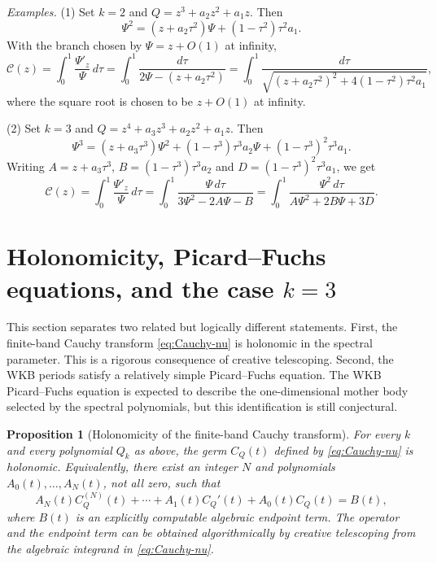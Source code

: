 \documentclass[10pt,twoside,a4paper,reqno]{amsart}
\theoremstyle{plain}
\newtheorem{pro}            {Proposition}
\theoremstyle{definition}
\theoremstyle{remark}
\newenvironment{proposition}{\begin{pro}}{\end{pro}}
\newcommand {\C} {\mathcal C}
\begin{document}
\noindent 
{\it Examples.} (1) Set $k=2$ and $Q=z^3+a_2z^2+a_1z$. Then
\[
\Psi^2=(z+a_2\tau^2)\Psi+(1-\tau^2)\tau^2a_1 .
\]
With the branch chosen by $\Psi=z+O(1)$ at infinity,
\[
\C(z)=\int_0^1\frac{\Psi'_z}{\Psi}\,d\tau
      =\int_0^1\frac{d\tau}{2\Psi-(z+a_2\tau^2)}
      =\int_0^1 \frac{d\tau}
      {\sqrt{(z+a_2\tau^2)^2+4(1-\tau^2)\tau^2a_1}},
\]
where the square root is chosen to be $z+O(1)$ at infinity.

\medskip \noindent
(2) Set $k=3$ and $Q=z^4+a_3z^3+a_2z^2+a_1z$. Then
\[
\Psi^3=(z+a_3\tau^3)\Psi^2+(1-\tau^3)\tau^3a_2\Psi+(1-\tau^3)^2\tau^3a_1.
\]
Writing $A=z+a_3\tau^3$, $B=(1-\tau^3)\tau^3a_2$ and
$D=(1-\tau^3)^2\tau^3a_1$, we get
\[
\C(z)=\int_0^1\frac{\Psi'_z}{\Psi}\,d\tau
     =\int_0^1\frac{\Psi\,d\tau}{3\Psi^2-2A\Psi-B}
     =\int_0^1\frac{\Psi^2\,d\tau}{A\Psi^2+2B\Psi+3D}.
\]




\section{Holonomicity, Picard--Fuchs equations, and the case $k=3$}
\label{sec:pf-k3}

This section separates two related but logically different statements.  First, the
finite-band Cauchy transform \eqref{eq:Cauchy-nu} is holonomic in the spectral
parameter.  This is a rigorous consequence of creative telescoping.  Second, the
WKB periods satisfy a relatively simple Picard--Fuchs equation.  The WKB
Picard--Fuchs equation is expected to describe the one-dimensional mother body
selected by the spectral polynomials, but this identification is still conjectural.

\begin{proposition}[Holonomicity of the finite-band Cauchy transform]
\label{prop:finiteband-holonomic}
For every $k$ and every polynomial $Q_k$ as above, the germ $C_Q(t)$ defined by
\eqref{eq:Cauchy-nu} is holonomic.  Equivalently, there exist an integer $N$ and
polynomials $A_0(t),\ldots,A_N(t)$, not all zero, such that
\begin{equation}\label{eq:finiteband-ode-general}
        A_N(t)C_Q^{(N)}(t)+\cdots+A_1(t)C_Q'(t)+A_0(t)C_Q(t)=B(t),
\end{equation}
where $B(t)$ is an explicitly computable algebraic endpoint term.  The operator
and the endpoint term can be obtained algorithmically by creative telescoping from
the algebraic integrand in \eqref{eq:Cauchy-nu}.
\end{proposition}
\end{document}
